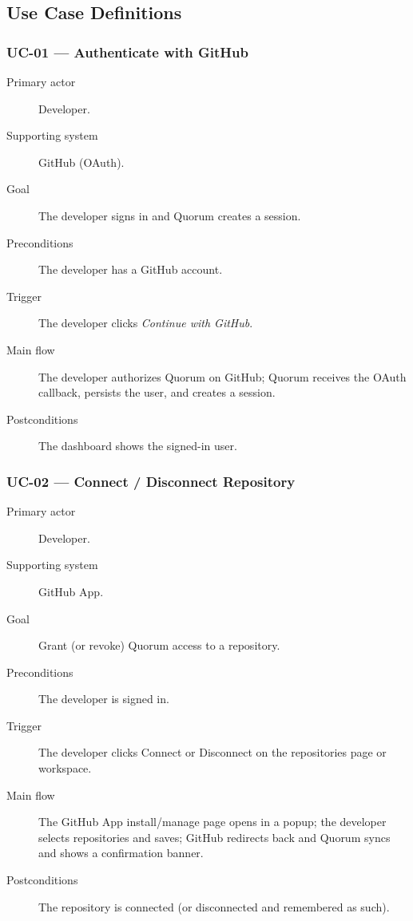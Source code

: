 \subsection{Use Case Definitions}

\subsubsection{UC-01 --- Authenticate with GitHub}
\begin{description}
  \item[Primary actor] Developer.
  \item[Supporting system] GitHub (OAuth).
  \item[Goal] The developer signs in and Quorum creates a session.
  \item[Preconditions] The developer has a GitHub account.
  \item[Trigger] The developer clicks \emph{Continue with GitHub}.
  \item[Main flow] The developer authorizes Quorum on GitHub; Quorum receives
        the OAuth callback, persists the user, and creates a session.
  \item[Postconditions] The dashboard shows the signed-in user.
\end{description}

\subsubsection{UC-02 --- Connect / Disconnect Repository}
\begin{description}
  \item[Primary actor] Developer.
  \item[Supporting system] GitHub App.
  \item[Goal] Grant (or revoke) Quorum access to a repository.
  \item[Preconditions] The developer is signed in.
  \item[Trigger] The developer clicks Connect or Disconnect on the
        repositories page or workspace.
  \item[Main flow] The GitHub App install/manage page opens in a popup; the
        developer selects repositories and saves; GitHub redirects back and
        Quorum syncs and shows a confirmation banner.
  \item[Postconditions] The repository is connected (or disconnected and
        remembered as such).
\end{description}


